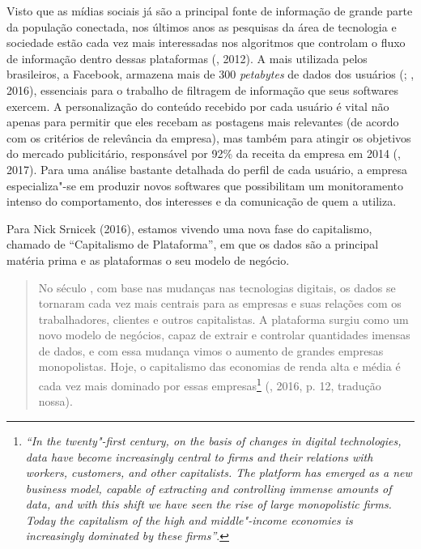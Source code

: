 Visto que as mídias sociais já são a principal fonte de informação de
grande parte da população conectada, nos últimos anos as pesquisas da
área de tecnologia e sociedade estão cada vez mais interessadas nos
algoritmos que controlam o fluxo de informação dentro dessas plataformas
(, 2012). A mais utilizada pelos brasileiros, a Facebook,
armazena mais de 300 \emph{petabytes} de dados dos usuários
(; , 2016), essenciais para o trabalho de filtragem de informação que seus softwares exercem. A personalização do conteúdo recebido por cada usuário é vital
não apenas para permitir que eles recebam as postagens mais relevantes
(de acordo com os critérios de relevância da empresa), mas também para
atingir os objetivos do mercado publicitário, responsável por 92\% da
receita da empresa em 2014 (, 2017). Para uma análise bastante
detalhada do perfil de cada usuário, a empresa especializa"-se em
produzir novos softwares que possibilitam um monitoramento intenso do
comportamento, dos interesses e da comunicação de quem a utiliza.

Para Nick Srnicek (2016), estamos vivendo uma nova fase do capitalismo,
chamado de ``Capitalismo de Plataforma'', em que os dados são a
principal matéria prima e as plataformas o seu modelo de negócio.

\begin{quote}
No século , com base nas mudanças nas tecnologias digitais, os dados
se tornaram cada vez mais centrais para as empresas e suas relações com
os trabalhadores, clientes e outros capitalistas. A plataforma surgiu
como um novo modelo de negócios, capaz de extrair e controlar
quantidades imensas de dados, e com essa mudança vimos o aumento de
grandes empresas monopolistas. Hoje, o capitalismo das economias de
renda alta e média é cada vez mais dominado por essas empresas\footnote{\emph{``In
  the twenty"-first century, on the basis of changes in digital
  technologies, data have become increasingly central to firms and their
  relations with workers, customers, and other capitalists. The platform
  has emerged as a new business model, capable of extracting and
  controlling immense amounts of data, and with this shift we have seen
  the rise of large monopolistic firms. Today the capitalism of the high
  and middle"-income economies is increasingly dominated by these
  firms''}.} (, 2016, p. 12, tradução nossa).
\end{quote}

